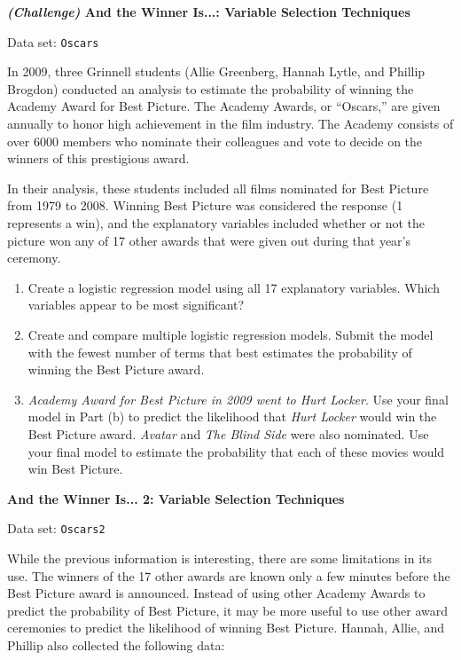 \documentclass[
]{report}
\begin{document}
\begin{list}{E..}{ \setlength{\itemsep}{1.2em}}
  \item \textbf{\textit{(Challenge)} And the Winner Is...: Variable Selection Techniques}

Data set: \texttt{Oscars}

In 2009, three Grinnell students (Allie Greenberg, Hannah Lytle, and Phillip Brogdon) conducted an analysis to estimate the probability of winning the Academy Award for Best Picture. The Academy Awards, or “Oscars,” are given annually to honor high achievement in the film industry. The Academy consists of over 6000 members who nominate their colleagues and vote to decide on the winners of this prestigious award.

In their analysis, these students included all films nominated for Best Picture from 1979 to 2008. Winning Best Picture was considered the response (1 represents a win), and the explanatory variables included whether or not the picture won any of 17 other awards that were given out during that year’s ceremony.

  \begin{enumerate}
    \item Create a logistic regression model using all 17 explanatory variables. Which variables appear to be most significant?
    \item Create and compare multiple logistic regression models. Submit the model with the fewest number of terms that best estimates the probability of winning the Best Picture award.
    \item \textit{Academy Award for Best Picture in 2009 went to \textit{Hurt Locker}}. Use your final model in Part (b) to predict the likelihood that \textit{Hurt Locker} would win the Best Picture award. \textit{Avatar} and \textit{The Blind Side} were also nominated. Use your final model to estimate the probability that each of these movies would win Best Picture.
  \end{enumerate}

  \item \textbf{And the Winner Is... 2: Variable Selection Techniques}

Data set: \texttt{Oscars2}

While the previous information is interesting, there are some limitations in its use. The winners of the 17 other awards are known only a few minutes before the Best Picture award is announced. Instead of using other Academy Awards to predict the probability of Best Picture, it may be more useful to use other award ceremonies to predict the likelihood of winning Best Picture. Hannah, Allie, and Phillip also collected the following data:


\end{list}
\end{document}
